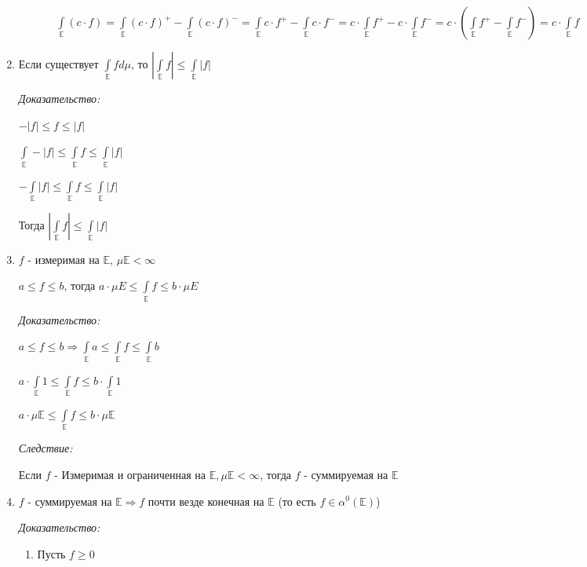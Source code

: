 \documentclass[paper=a4, fontsize=17pt]{article}
\begin{document}
\begin{enumerate}
\begin{enumerate}
\begin{enumerate}
			$\int\limits_{\mathds{E}} (c \cdot f) = \int\limits_{\mathds{E}} (c \cdot f)^+ - \int\limits_{\mathds{E}} (c \cdot f)^- = \int\limits_{\mathds{E}} c \cdot f^+ - \int\limits_{\mathds{E}} c \cdot f^- = c \cdot \int\limits_{\mathds{E}} f^+ - c \cdot \int\limits_{\mathds{E}} f^- = c \cdot (\int\limits_{\mathds{E}} f^+ - \int\limits_{\mathds{E}} f^-) = c \cdot \int\limits_{\mathds{E}} f$
		\end{enumerate}
	\end{enumerate}

	\item Если существует $\int\limits_{\mathds{E}} f d\mu$, то $|\int\limits_{\mathds{E}} f| \leqslant \int\limits_{\mathds{E}} |f|$

	\emph{Доказательство:}

	$-|f| \leqslant f \leqslant |f|$

	$\int\limits_{\mathds{E}} -|f| \leqslant \int\limits_{\mathds{E}} f \leqslant \int\limits_{\mathds{E}} |f|$

	$-\int\limits_{\mathds{E}} |f| \leqslant \int\limits_{\mathds{E}} f \leqslant \int\limits_{\mathds{E}} |f|$

	Тогда $|\int\limits_{\mathds{E}} f| \leqslant \int\limits_{\mathds{E}} |f|$


	\item $f$ - измеримая на $\mathds{E}$, $\mu \mathds{E} < \infty$

	$a \leqslant f \leqslant b$, тогда $a \cdot \mu E \leqslant \int\limits_{\mathds{E}} f \leqslant b \cdot \mu E$

	\emph{Доказательство: }

	$a \leqslant f \leqslant b \Rightarrow \int\limits_{\mathds{E}}a \leqslant \int\limits_{\mathds{E}} f \leqslant \int\limits_{\mathds{E}} b$

	$a \cdot \int\limits_{\mathds{E}} 1 \leqslant \int\limits_{\mathds{E}} f \leqslant b \cdot \int\limits_{\mathds{E}} 1$

	$a \cdot \mu \mathds{E} \leqslant \int\limits_{\mathds{E}} f \leqslant b \cdot \mu \mathds{E}$

	\emph{Следствие:}

	Если $f$ - Измеримая и ограниченная на $\mathds{E}, \mu \mathds{E} < \infty$, тогда $f$ - суммируемая на $\mathds{E}$

	\item $f$ - суммируемая на $\mathds{E} \Rightarrow f$ почти везде конечная на $\mathds{E}$ (то есть $f \in \alpha^0(\mathds{E})$)

	\emph{Доказательство:}
	\begin{enumerate}
		\item Пусть $f \geqslant 0$


\end{enumerate}
\end{enumerate}
\end{document}
